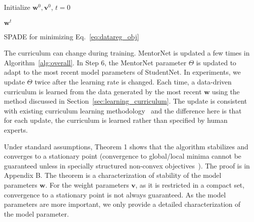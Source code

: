 \documentclass{article}
\begin{document}
{
\vspace{-2mm}
\begin{algorithm}[ht]
\footnotesize
{}
\LinesNumbered
{}
Initialize $\mathbf{w}^{0}, \mathbf{v}^{0}$, $t = 0$\;

\Return $\mathbf{w}^{t}$
\caption{{\small SPADE for minimizing Eq.~\eqref{eq:datareg_obj}}}
\label{alg:overall}
\end{algorithm}
\vspace{-2mm}
}



The curriculum can change during training. MentorNet is updated a few times in Algorithm~\ref{alg:overall}. In Step 6, the MentorNet parameter $\Theta$ is updated to adapt to the most recent model parameters of StudentNet. In experiments, we update $\Theta$ twice after the learning rate is changed. Each time, a data-driven curriculum is learned from the data generated by the most recent $\mathbf{w}$ using the method discussed in Section~\ref{sec:learning_curriculum}. The update is consistent with existing curriculum learning methodology~\cite{bengio2009curriculum,kumar2010self} and the difference here is that for each update, the curriculum is learned rather than specified by human experts.

Under standard assumptions, Theorem 1 shows that the algorithm stabilizes and converges to a stationary point (convergence to global/local minima cannot be guaranteed unless in specially structured non-convex objectives~\cite{chen2018gradient,zhou2017stochastic,zhou2017mirror}). The proof is in Appendix B. The theorem is a characterization of stability of the model parameters $\mathbf{w}$. For the weight parameters $\mathbf{v}$, as it is restricted in a compact set, convergence to a stationary point is not always guaranteed. As the model parameters are more important, we only provide a detailed characterization of the model parameter.
\end{document}
